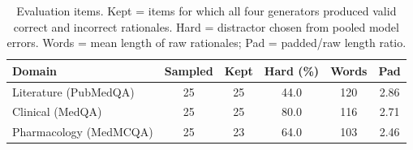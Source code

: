 \begin{table}[t]
\centering
\caption{Evaluation items. Kept = items for which all four generators produced valid correct and incorrect rationales. Hard = distractor chosen from pooled model errors. Words = mean length of raw rationales; Pad = padded/raw length ratio.}
\label{tab:data}
\setlength{\tabcolsep}{3.5pt}
\begin{tabular}{lccccc}
\toprule
Domain & Sampled & Kept & Hard (\%) & Words & Pad \\
\midrule
Literature (PubMedQA) & 25 & 25 & 44.0 & 120 & 2.86\\
Clinical (MedQA) & 25 & 25 & 80.0 & 116 & 2.71\\
Pharmacology (MedMCQA) & 25 & 23 & 64.0 & 103 & 2.46\\
\bottomrule
\end{tabular}
\end{table}
